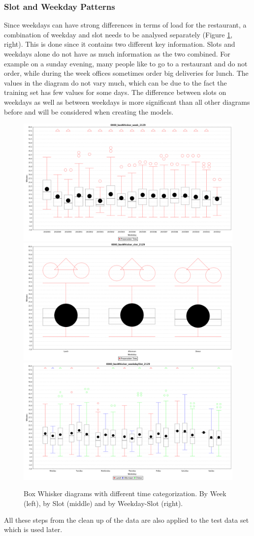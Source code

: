 \subsubsection{Slot and Weekday Patterns}
Since weekdays can have strong differences in terms of load for the restaurant, a combination of weekday and slot needs to be analysed separately (Figure \ref{fig:triple_boxWhisker}, right).
This is done since it contains two different key information. Slots and weekdays alone do not have as much information as the two combined. For example on a sunday evening, many people like to go to a restaurant and do not order, while during the week offices sometimes order big deliveries for lunch. The values in the diagram do not vary much, which can be due to the fact the training set has few values for some days.\newline
The difference between slots on weekdays as well as between weekdays is more significant than all other diagrams before and will be considered when creating the models.

\begin{figure}[htp]

\centering
\includegraphics[width=.3\textwidth]{images/0000_boxWhisker_week_2129.png}\hfill
\includegraphics[width=.3\textwidth]{images/0000_boxWhisker_slot_2129.png}\hfill
\includegraphics[width=.3\textwidth]{images/0000_boxWhisker_weekdaySlot_2129.png}

\caption{Box Whisker diagrams with different time categorization. By Week (left), by Slot (middle) and by Weekday-Slot (right).}
\label{fig:triple_boxWhisker}

\end{figure}

All these steps from the clean up of the data are also applied to the test data set which is used later.

